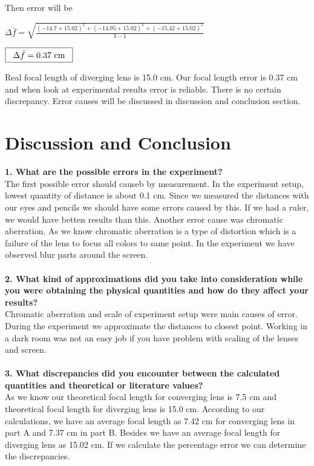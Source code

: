 \documentclass[a4paper,12pt]{report}
\begin{document}
\begin{center}
\end{center}
Then error will be
\begin{center}
	$\Delta\bar{f}=\sqrt{\frac{(-14.7+15.02)^{2}+(-14.95+15.02)^{2}+(-15.42+15.02)^{2}}{3-1}}$
\end{center}
\begin{center}
	$\framebox[80pt]{$\Delta\bar{f}=0.37$ cm}$
\end{center}
Real focal length of diverging lens is 15.0 cm. Our focal length error is 0.37 cm and when look at experimental results error is reliable. There is no certain discrepancy. Error causes will be discussed in discussion and conclusion section. 





\chapter{Discussion and Conclusion}
\textbf{1. What are the possible errors in the experiment?}\\
The first possible error should causeb by measurement. In the experiment setup, lowest quantity of distance is about 0.1 cm. Since we measured the distances with our eyes and pencils we should have some errors caused by this. If we had a ruler, we would have betten results than this. Another error cause was chromatic aberration. As we know chromatic aberration is a type of distortion which is a failure of the lens to focus all colors to same point. In the experiment we have observed blur parts around the screen.\\\\
\textbf{2. What kind of approximations did you take into consideration while you were obtaining the physical quantities and how do they affect your results?}\\
Chromatic aberration and scale of experiment setup were main causes of error. During the experiment we approximate the distances to closest point. Working in a dark room was not an easy job if you have problem with scaling of the lenses and screen.\\\\
\textbf{3. What discrepancies did you encounter between the calculated quantities and theoretical or literature values?}\\
As we know our theoretical focal length for converging lens is 7.5 cm and theoretical focal length for diverging lens is 15.0 cm. According to our calculations, we have an average focal length as 7.42 cm for converging lens in part A and 7.37 cm in part B. Besides we have an average focal length for diverging lens as 15.02 cm. If we calculate the percentage error we can determine the discrepancies.
\end{document}
